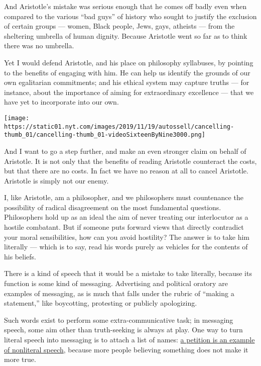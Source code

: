And Aristotle's mistake was serious enough that he comes off badly even
when compared to the various ``bad guys'' of history who sought to
justify the exclusion of certain groups --- women, Black people, Jews,
gays, atheists --- from the sheltering umbrella of human dignity.
Because Aristotle went so far as to think there was no umbrella.

Yet I would defend Aristotle, and his place on philosophy syllabuses, by
pointing to the benefits of engaging with him. He can help us identify
the grounds of our own egalitarian commitments; and his ethical system
may capture truths --- for instance, about the importance of aiming for
extraordinary excellence --- that we have yet to incorporate into our
own.

\texttt{[image: https://static01.nyt.com/images/2019/11/19/autossell/cancelling-thumb\_01/cancelling-thumb\_01-videoSixteenByNine3000.png]}

And I want to go a step further, and make an even stronger claim on
behalf of Aristotle. It is not only that the benefits of reading
Aristotle counteract the costs, but that there are no costs. In fact we
have no reason at all to cancel Aristotle. Aristotle is simply not our
enemy.

I, like Aristotle, am a philosopher, and we philosophers must
countenance the possibility of radical disagreement on the most
fundamental questions. Philosophers hold up as an ideal the aim of never
treating our interlocutor as a hostile combatant. But if someone puts
forward views that directly contradict your moral sensibilities, how can
you avoid hostility? The answer is to take him literally --- which is to
say, read his words purely as vehicles for the contents of his beliefs.

There is a kind of speech that it would be a mistake to take literally,
because its function is some kind of messaging. Advertising and
political oratory are examples of messaging, as is much that falls under
the rubric of ``making a statement,'' like boycotting, protesting or
publicly apologizing.

Such words exist to perform some extra-communicative task; in messaging
speech, some aim other than truth-seeking is always at play. One way to
turn literal speech into messaging is to attach a list of names:
\href{https://www.nytimes.com/2019/08/13/opinion/philosophers-petitions.html}{a
petition is an example of nonliteral speech}, because more people
believing something does not make it more true.

